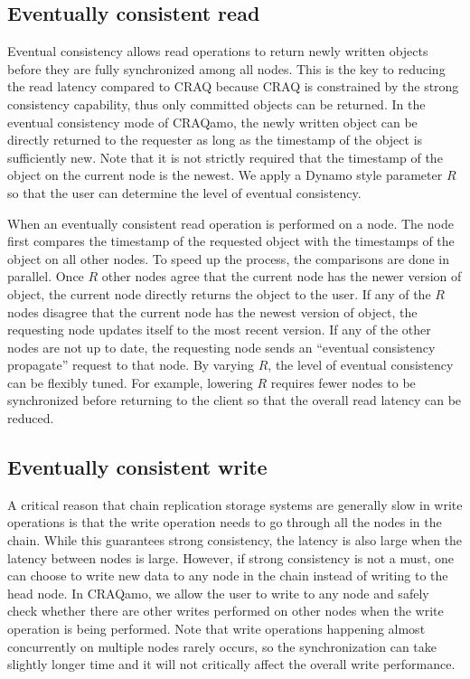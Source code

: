 \subsection{Eventually consistent read}
Eventual consistency allows read operations to return newly written objects before they are fully synchronized among all nodes. This is the key to reducing the read latency compared to CRAQ because CRAQ is constrained by the strong consistency capability, thus only committed objects can be returned. In the eventual consistency mode of CRAQamo, the newly written object can be directly returned to the requester as long as the timestamp of the object is sufficiently new. Note that it is not strictly required that the timestamp of the object on the current node is the newest. We apply a Dynamo style parameter $R$ so that the user can determine the level of eventual consistency.

When an eventually consistent read operation is performed on a node. The node first compares the timestamp of the requested object with the timestamps of the object on all other nodes. To speed up the process, the comparisons are done in parallel. Once $R$ other nodes agree that the current node has the newer version of object, the current node directly returns the object to the user. If any of the $R$ nodes disagree that the current node has the newest version of object, the requesting node updates itself to the most recent version. If any of the other nodes are not up to date, the requesting node sends an ``eventual consistency propagate'' request to that node.  By varying $R$, the level of eventual consistency can be flexibly tuned. For example, lowering $R$ requires fewer nodes to be synchronized before returning to the client so that the overall read latency can be reduced.

\subsection{Eventually consistent write}
A critical reason that chain replication storage systems are generally slow in write operations is that the write operation needs to go through all the nodes in the chain. While this guarantees strong consistency, the latency is also large when the latency between nodes is large. However, if strong consistency is not a must, one can choose to write new data to any node in the chain instead of writing to the head node. In CRAQamo, we allow the user to write to any node and safely check whether there are other writes performed on other nodes when the write operation is being performed. Note that write operations happening almost concurrently on multiple nodes rarely occurs, so the synchronization can take slightly longer time and it will not critically affect the overall write performance.

